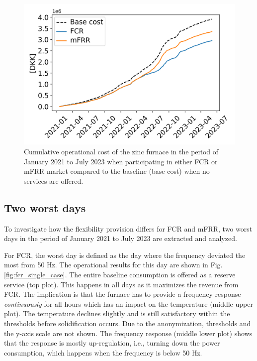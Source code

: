 \documentclass[conference]{IEEEtran}
\begin{document}
\begin{figure}[t]
    \centering
    \includegraphics[width=0.75\columnwidth]{../figures/cumulative_cost_comparison.png}
    \caption{\small{Cumulative operational cost of the zinc furnace in the period of January 2021 to July 2023 when participating in either FCR or mFRR market compared to the baseline (base cost) when no services are offered. \vspace{-3mm}}}
    \label{fig:cumulative_cost_comparison}
\end{figure}

\vspace{1mm}
\subsection{Two worst days}
\vspace{-1mm}
To investigate how the flexibility provision differs for FCR and mFRR, two worst days in the period of January 2021 to July 2023 are extracted and analyzed.

For FCR, the worst day is defined as the day where the frequency deviated the most from 50 Hz. The operational results for this day are shown in Fig. \ref{fig:fcr_single_case}. The entire baseline consumption is offered as a reserve service (top plot). This happens in all days  as it maximizes the revenue from FCR. The implication is that the furnace has to provide a frequency response \textit{continuously} for all hours  which has an impact on the temperature (middle upper plot). The temperature  declines slightly and is still satisfactory within the thresholds before solidification occurs. Due to the anonymization, thresholds and the y-axis scale are not shown. The frequency response (middle lower plot) shows that the response is mostly up-regulation, i.e., turning down the power consumption, which happens when the frequency is below 50 Hz.
\end{document}
